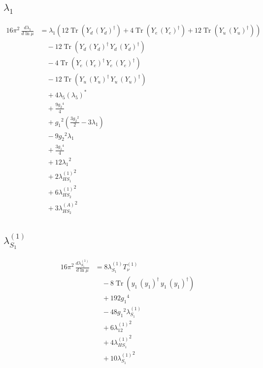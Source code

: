 \documentclass[10pt,a4paper]{article}
\begin{document}
\subsection*{$\lambda_1$}
\begin{align*}
16\pi^2\,\frac{d \lambda_1}{d\ln\mu} &={\lambda_1} (12 \operatorname{Tr}\!\left({Y_d}\,\left({Y_d}\right)^{\dagger}\right)+4 \operatorname{Tr}\!\left({Y_e}\,\left({Y_e}\right)^{\dagger}\right)+12 \operatorname{Tr}\!\left({Y_u}\,\left({Y_u}\right)^{\dagger}\right)) \\
&\quad -12 \operatorname{Tr}\!\left({Y_d}\,\left({Y_d}\right)^{\dagger}\,{Y_d}\,\left({Y_d}\right)^{\dagger}\right) \\
&\quad -4 \operatorname{Tr}\!\left({Y_e}\,\left({Y_e}\right)^{\dagger}\,{Y_e}\,\left({Y_e}\right)^{\dagger}\right) \\
&\quad -12 \operatorname{Tr}\!\left({Y_u}\,\left({Y_u}\right)^{\dagger}\,{Y_u}\,\left({Y_u}\right)^{\dagger}\right) \\
&\quad +4 {\lambda_5} \left({\lambda_5}\right)^{*} \\
&\quad +\frac{9 {g_2}^4}{4} \\
&\quad +{g_1}^2 \left(\frac{3 {g_2}^2}{2}-3 {\lambda_1}\right) \\
&\quad -9 {g_2}^2 {\lambda_1} \\
&\quad +\frac{3 {g_1}^4}{4} \\
&\quad +12 {\lambda_1}^2 \\
&\quad +2 {\lambda_{HS_1}^{(1)}}^2 \\
&\quad +6 {\lambda_{HS_2}^{(1)}}^2 \\
&\quad +3 {\lambda_{HS_2}^{(A)}}^2 \\
\end{align*}
\subsection*{$\lambda_{S_1}^{(1)}$}
\begin{align*}
16\pi^2\,\frac{d \lambda_{S_1}^{(1)}}{d\ln\mu} &=8 {\lambda_{S_1}^{(1)}} T_{\nu}^{(1)} \\
&\quad -8 \operatorname{Tr}\!\left({y_1}\,\left({y_1}\right)^{\dagger}\,{y_1}\,\left({y_1}\right)^{\dagger}\right) \\
&\quad +192 {g_1}^4 \\
&\quad -48 {g_1}^2 {\lambda_{S_1}^{(1)}} \\
&\quad +6 {\lambda_{12}^{(1)}}^2 \\
&\quad +4 {\lambda_{HS_1}^{(1)}}^2 \\
&\quad +10 {\lambda_{S_1}^{(1)}}^2 \\
\end{align*}
\end{document}

